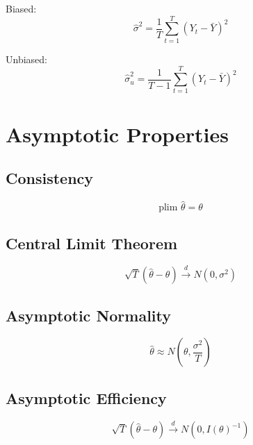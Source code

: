 Biased:
\[
\hat{\sigma}^2 = \frac{1}{T} \sum_{t=1}^T (Y_t - \bar{Y})^2
\]

Unbiased:
\[
\hat{\sigma}^2_u = \frac{1}{T-1} \sum_{t=1}^T (Y_t - \bar{Y})^2
\]

\section{Asymptotic Properties}

\subsection{Consistency}

\[
\text{plim } \hat{\theta} = \theta
\]

\subsection{Central Limit Theorem}

\[
\sqrt{T}(\hat{\theta} - \theta) \xrightarrow{d} N(0, \sigma^2)
\]

\subsection{Asymptotic Normality}

\[
\hat{\theta} \approx N\left(\theta, \frac{\sigma^2}{T}\right)
\]

\subsection{Asymptotic Efficiency}

\[
\sqrt{T}(\hat{\theta} - \theta) \xrightarrow{d} N(0, I(\theta)^{-1})
\]